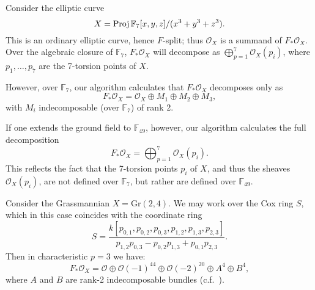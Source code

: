 \documentclass[12pt]{article}
\def\O{\mathcal O}
\numberwithin{equation}{section}
\theoremstyle{theorem}
\numberwithin{thm}{section}
\theoremstyle{definition}
\begin{document}
\begin{exa}\label{algclos}
  Consider the elliptic curve
  \[ X = \operatorname{Proj} \mathbb F_7[x,y,z]/(x^3+y^3+z^3). \]
  This is an ordinary elliptic curve, hence $F$-split; thus $\O_X$ is a summand of $F_* \O_X$. Over the algebraic closure of $\mathbb F_7$, $F_*\O_X$ will decompose as $\bigoplus_{p=1}^7 \O_X(p_i)$, where $p_1,\dots,p_7$ are the 7-torsion points of $X$.

  However, over $\mathbb F_7$, our algorithm calculates that $F_*\O_X$ decomposes only as
  $$ F_* \O_X =\O_X \oplus M_1\oplus M_2\oplus M_3, $$
  with $M_i$ indecomposable (over $\mathbb F_7$) of rank 2.

  If one extends the ground field to $\mathbb F_{49}$, however, our algorithm calculates the full decomposition
  $$ F_* \O_X=\bigoplus_{p=1}^7 \O_X(p_i). $$
  This reflects the fact that the 7-torsion points $p_i$ of $X$, and thus the sheaves $\O_X(p_i)$, are not defined over $\mathbb F_7$, but rather are defined over $\mathbb F_{49}$.
\end{exa}

\begin{exa}
  Consider the Grassmannian $X = \mathrm{Gr(2,4)}$. We may work over the Cox ring $S$,
  which in this case coincides with the coordinate ring
  \[ S = \frac{k[p_{0,1},p_{0,2},p_{0,3},p_{1,2},p_{1,3},p_{2,3}]}{p_{1,2}p_{0,3}-p_{0,2}p_{1,3}+p_{0,1}p_{2,3}}. \]
  Then in characteristic $p=3$ we have:
  \[ F_*\O_X = \O \oplus \O(-1)^{44} \oplus \O(-2)^{20} \oplus A^4 \oplus B^4, \]
  where $A$ and $B$ are rank-2 indecomposable bundles (c.f.~\cite{RSVdB22}).
\end{exa}
\end{document}
